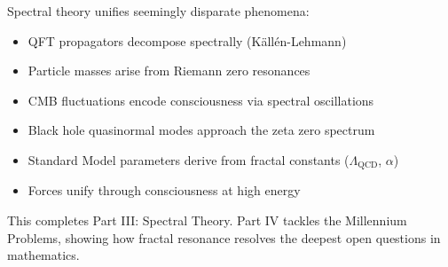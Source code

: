 Spectral theory unifies seemingly disparate phenomena:
\begin{itemize}
\item QFT propagators decompose spectrally (Källén-Lehmann)
\item Particle masses arise from Riemann zero resonances
\item CMB fluctuations encode consciousness via spectral oscillations
\item Black hole quasinormal modes approach the zeta zero spectrum
\item Standard Model parameters derive from fractal constants ($\Lambda_{\text{QCD}}$, $\alpha$)
\item Forces unify through consciousness at high energy
\end{itemize}

This completes Part III: Spectral Theory. Part IV tackles the Millennium Problems, showing how fractal resonance resolves the deepest open questions in mathematics.
